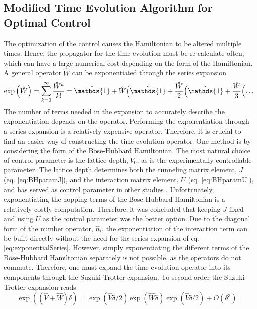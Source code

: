 \subsection{Modified Time Evolution Algorithm for Optimal Control}
\label{sec:modTMDRG}
The optimization of the control causes the Hamiltonian to be altered multiple times. Hence, the propagator for the time-evolution must be re-calculate often, which can have a large numerical cost depending on the form of the Hamiltonian. A general operator $\hat{W}$ can be exponentiated through the series expansion
\begin{equation}
	\exp \left( \hat{W} \right) = \sum_{k = 0}^{\infty} \frac{\hat{W}^k}{k!} = \hat{\mathds{1}} + \hat{W} \Bigl(  \hat{\mathds{1}} + \frac{\hat{W}}{2} \Bigl( \hat{\mathds{1}} + \frac{\hat{W}}{3} \Bigl( \ldots
\label{eq:exponentialSeries}
\end{equation}
The number of terms needed in the expansion to accurately describe the exponentiation depends on the operator. Performing the exponentiation through a series expansion is a relatively expensive operator. Therefore, it is crucial to find an easier way of constructing the time evolution operator.
One method is by considering the form of the Bose-Hubbard Hamiltonian. The most natural choice of control parameter is the lattice depth, $V_0$, as is the experimentally controllable parameter. The lattice depth determines both the tunneling matrix element, $J$ (eq. \eqref{eq:BHparamJ}), and the interaction matrix element, $U$ (eq. \eqref{eq:BHparamU}), and has served as control parameter in other studies \cite{FrankBloch,Doria2011}.   
Unfortunately, exponentiating the hopping terms of the Bose-Hubbard Hamiltonian is a relatively costly computation. Therefore, it was concluded that keeping $J$ fixed and using $U$ as the control parameter was the better option. Due to the diagonal form of the number operator, $\hat{n}_i$, the exponentiation of the interaction term can be built directly without the need for the series expansion of eq. \eqref{eq:exponentialSeries}.
However, simply exponentiating the different terms of the Bose-Hubbard Hamiltonian separately is not possible, as the operators do not commute. Therefore, one must expand the time evolution operator into its components through the Suzuki-Trotter expansion. To second order the Suzuki-Trotter expansion reads
\begin{equation}
	\exp\left(  ( \hat{V} + \hat{W}  ) \delta \right) = \exp\left(  \hat{V} \delta /2  \right) \exp\left(  \hat{W} \delta   \right) \exp\left(  \hat{V} \delta /2  \right) + O(\delta^3) \; . \label{eq:SuzukiTrotter}
\end{equation}

